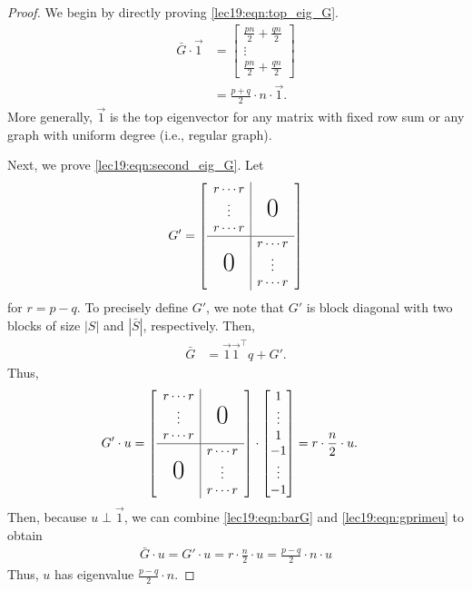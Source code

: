 \begin{proof}
We begin by directly proving \eqref{lec19:eqn:top_eig_G}.
\begin{align}	
	\bar{G} \cdot \vec{1}  &= \begin{bmatrix}
           \frac{pn}{2} + \frac{qn}{2} \\
           \vdots \\
           \frac{pn}{2} + \frac{qn}{2}
         \end{bmatrix} \\
         &= \frac{p+q}{2} \cdot n \cdot \vec{1}.
\end{align}
More generally, $\vec{1}$ is the top eigenvector for any matrix with fixed row sum or any graph with uniform degree (i.e., regular graph). 

Next, we prove \eqref{lec19:eqn:second_eig_G}. Let 
\begin{align}
    G' = \left[
        \begin{array}{c|c}
        r \cdots r \\
        \vdots & \makebox{\text{\huge 0}} \\
        r \cdots r \\
        \hline
        & r \cdots r \\
        \makebox{\text{\huge 0}} & \vdots \\
        & r \cdots r
        \end{array}
        \right]
\end{align}
for $r = p - q$. To precisely define $G'$, we note that $G'$ is block diagonal with two blocks of size $|S|$ and $|\bar{S}|$, respectively. Then, 
\begin{align}	
	\bar{G} &= \vec{1} \vec{1}^\top q + G'. \label{lec19:eqn:barG}
\end{align}
Thus,
\begin{align}
 G' \cdot u &= \left[
    \begin{array}{c|c}
    r \cdots r \\
    \vdots & \makebox{\text{\huge 0}} \\
    r \cdots r \\
    \hline
    & r \cdots r \\
    \makebox{\text{\huge 0}} & \vdots \\
    & r \cdots r
    \end{array}
    \right] \cdot \begin{bmatrix}
           1 \\ \vdots \\ 1\\ -1 \\
           \vdots \\
           -1
         \end{bmatrix} = r \cdot \frac{n}{2} \cdot u. \label{lec19:eqn:gprimeu}
\end{align}
Then, because $u \perp \vec{1}$, we can combine \eqref{lec19:eqn:barG} and \eqref{lec19:eqn:gprimeu} to obtain
\begin{align}
\bar{G} \cdot u =  G' \cdot u =  r \cdot \frac{n}{2} \cdot u  = \frac{p-q}{2} \cdot n \cdot u
\end{align}
Thus, $u$ has eigenvalue $\frac{p-q}{2} \cdot n$. 
\end{proof}

